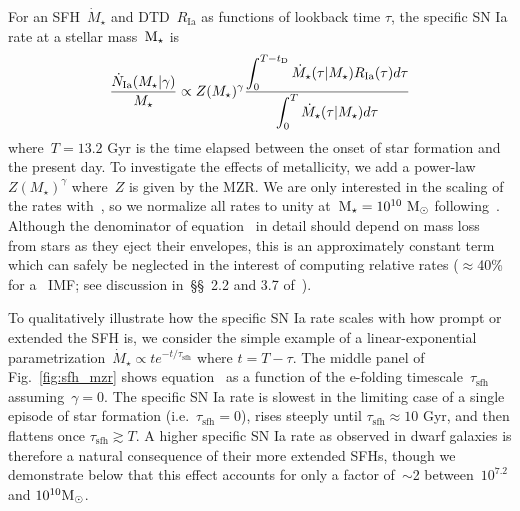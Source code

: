 \documentclass[ms.tex]{subfiles}
\begin{document}
For an SFH~$\dot{M}_\star$ and DTD~$R_\text{Ia}$ as functions of lookback time
$\tau$, the specific SN Ia rate at a stellar mass~$\text{M}_\star$ is
\begin{equation}
\frac{\dot{N}_\text{Ia}(M_\star | \gamma)}{M_\star} \propto Z(M_\star)^\gamma
\frac{\displaystyle{
	\int_0^{T - t_\text{D}}\dot{M}_\star(\tau | M_\star) R_\text{Ia}(\tau) d\tau
}}{\displaystyle{
	\int_0^T \dot{M}_\star(\tau | M_\star) d\tau
}}
\label{eq:specia}
\end{equation}
where~$T = 13.2$ Gyr is the time elapsed between the onset of star formation
and the present day.
To investigate the effects of metallicity, we add a power-law
$Z(M_\star)^\gamma$ where~$Z$ is given by the MZR.
We are only interested in the scaling of the rates with~\mstar, so we normalize
all rates to unity at~$\text{M}_\star = 10^{10}~\text{M}_\odot$ following~\citet{Brown2019}.
Although the denominator of equation~ in detail should depend
on mass loss from stars as they eject their envelopes, this is an approximately
constant term which can safely be neglected in the interest of computing
relative rates ($\approx$40\% for a~\citealt{Kroupa2001} IMF; see discussion
in~\S\S~2.2 and 3.7 of~\citealt*{Weinberg2017}).
\par
To qualitatively illustrate how the specific SN Ia rate scales with how prompt
or extended the SFH is, we consider the simple example of a linear-exponential
parametrization~$\dot{M}_\star \propto te^{-t/\tau_\text{sfh}}$ where
$t = T - \tau$.
The middle panel of Fig.~\ref{fig:sfh_mzr} shows equation~ as
a function of the e-folding timescale~$\tau_\text{sfh}$ assuming~$\gamma = 0$.
The specific SN Ia rate is slowest in the limiting case of a single episode of
star formation (i.e.~$\tau_\text{sfh} = 0$), rises steeply until
$\tau_\text{sfh} \approx 10$ Gyr, and then flattens once
$\tau_\text{sfh} \gtrsim T$.
A higher specific SN Ia rate as observed in dwarf galaxies is therefore a
natural consequence of their more extended SFHs, though we demonstrate below
that this effect accounts for only a factor of~$\sim$2 between~$10^{7.2}$ and
$10^{10} \text{M}_\odot$.
\end{document}
